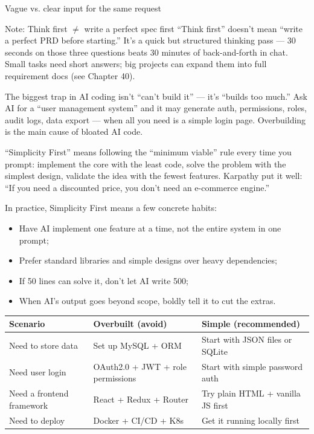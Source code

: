 \begin{center}\small\color{gray}Vague vs. clear input for the same request\end{center}

\begin{tcbwarn}{Note: Think first $\neq$ write a perfect spec first}
“Think first” doesn't mean “write a perfect PRD before starting.” It's a quick but structured thinking pass — 30 seconds on those three questions beats 30 minutes of back-and-forth in chat. Small tasks need short answers; big projects can expand them into full requirement docs (see Chapter 40).

\end{tcbwarn}


The biggest trap in AI coding isn't “can't build it” — it's “builds too much.” Ask AI for a “user management system” and it may generate auth, permissions, roles, audit logs, data export — when all you need is a simple login page. Overbuilding is the main cause of bloated AI code.

“Simplicity First” means following the “minimum viable” rule every time you prompt: implement the core with the least code, solve the problem with the simplest design, validate the idea with the fewest features. Karpathy put it well: “If you need a discounted price, you don't need an e-commerce engine.”

In practice, Simplicity First means a few concrete habits:

\begin{itemize}
  \item Have AI implement one feature at a time, not the entire system in one prompt;
  \item Prefer standard libraries and simple designs over heavy dependencies;
  \item If 50 lines can solve it, don't let AI write 500;
  \item When AI's output goes beyond scope, boldly tell it to cut the extras.
\end{itemize}

\begin{center}
\begin{tabularx}{\linewidth}{|X|X|X|}
\hline
\textbf{Scenario} & \textbf{Overbuilt (avoid)} & \textbf{Simple (recommended)} \tabularnewline
\hline
Need to store data & Set up MySQL + ORM & Start with JSON files or SQLite \tabularnewline
Need user login & OAuth2.0 + JWT + role permissions & Start with simple password auth \tabularnewline
Need a frontend framework & React + Redux + Router & Try plain HTML + vanilla JS first \tabularnewline
Need to deploy & Docker + CI/CD + K8s & Get it running locally first \tabularnewline
\hline
\end{tabularx}
\end{center}

